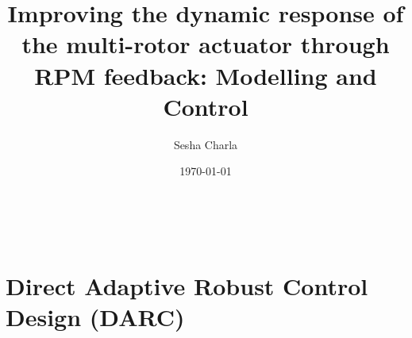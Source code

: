 \documentclass[letterpaper, 11pt]{article}
\title{Improving the dynamic response of the multi-rotor actuator through RPM feedback: Modelling and Control}
\author{Sesha Charla}
\date{\today}
\begin{document}
\maketitle
\tableofcontents
\newpage
\
\newpage

\newpage

\newpage

\newpage


\newpage
\section{Direct Adaptive Robust Control Design (DARC)}

%
\newpage


\end{document}
